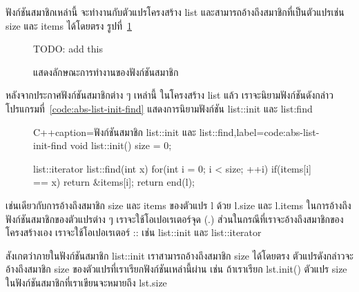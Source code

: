 ฟังก์ชัน{\wbr}สมาชิก{\wbr}เหล่านี้ จะ{\wbr}ทำงาน{\wbr}กับ{\wbr}ตัวแปร{\wbr}โครงสร้าง {\ct list}
และ{\wbr}สามารถ{\wbr}อ้าง{\wbr}ถึง{\wbr}สมาชิก{\wbr}ที่{\wbr}เป็น{\wbr}ตัวแปร{\wbr}เช่น {\ct size} และ {\ct items} ได้{\wbr}โดย{\wbr}ตรง{\wbr}
รูป{\wbr}ที่~\ref{fig:abs-member-functions}

\begin{figure}
TODO: add this
\caption{แสดง{\wbr}ลักษณะ{\wbr}การ{\wbr}ทำงาน{\wbr}ของ{\wbr}ฟังก์ชัน{\wbr}สมาชิก}
\label{fig:abs-member-functions}
\end{figure}

หลังจาก{\wbr}ประกาศ{\wbr}ฟังก์ชัน{\wbr}สมาชิก{\wbr}ต่าง ๆ เหล่านี้ ใน{\wbr}โครงสร้าง {\ct list} แล้ว{\wbr}
เรา{\wbr}จะ{\wbr}นิยาม{\wbr}ฟังก์ชัน{\wbr}ดังกล่าว โปรแกรม{\wbr}ที่~\ref{code:abs-list-init-find}
แสดง{\wbr}การ{\wbr}นิยาม{\wbr}ฟังก์ชัน {\ct list::init} และ {\ct list:find}

\begin{figure}
\latintext
\begin{codelist}{C++}{caption={\thaitext ฟังก์ชัน{\wbr}สมาชิก {\ct list::init} และ {\ct list::find}\latintext},label=code:abs-list-init-find}
void list::init()
{
  size = 0;
}

list::iterator list::find(int x)
{
  for(int i = 0; i < size; ++i)
    if(items[i] == x)
      return &items[i];
  return end(l);
}
\end{codelist}
\thaitext
\end{figure}

เช่นเดียวกับ{\wbr}การ{\wbr}อ้าง{\wbr}ถึง{\wbr}สมาชิก {\ct size} และ {\ct items} ของ{\wbr}ตัวแปร {\ct l} ด้วย{\wbr}
{\ct l.size} และ {\ct l.items} ใน{\wbr}การ{\wbr}อ้าง{\wbr}ถึง{\wbr}ฟังก์ชัน{\wbr}สมาชิก{\wbr}ของ{\wbr}ตัวแปร{\wbr}ต่าง ๆ
เรา{\wbr}จะ{\wbr}ใช้{\wbr}โอ{\wbr}เปอเรเตอร์{\wbr}จุด ({\ct .})  ส่วน{\wbr}ใน{\wbr}กรณี{\wbr}ที่{\wbr}เรา{\wbr}จะ{\wbr}อ้าง{\wbr}ถึง{\wbr}สมาชิก{\wbr}ของ{\wbr}โครงสร้าง{\wbr}เอง{\wbr}
เรา{\wbr}จะ{\wbr}ใช้{\wbr}โอ{\wbr}เปอเรเตอร์ {\ct ::} เช่น {\ct list::init} และ {\ct
  list::iterator}

สังเกต{\wbr}ว่า{\wbr}ภายใน{\wbr}ฟังก์ชัน{\wbr}สมาชิก {\ct list::init} เรา{\wbr}สามารถ{\wbr}อ้าง{\wbr}ถึง{\wbr}สมาชิก {\ct size}
ได้{\wbr}โดย{\wbr}ตรง ตัวแปร{\wbr}ดังกล่าว{\wbr}จะ{\wbr}อ้าง{\wbr}ถึง{\wbr}สมาชิก {\ct size}
ของ{\wbr}ตัวแปร{\wbr}ที่{\wbr}เรา{\wbr}เรียก{\wbr}ฟังก์ชัน{\wbr}เหล่านี้{\wbr}ผ่าน เช่น ถ้า{\wbr}เรา{\wbr}เรียก {\ct lst.init()} ตัวแปร{\wbr}
{\ct size} ใน{\wbr}ฟังก์ชัน{\wbr}สมาชิก{\wbr}ที่{\wbr}เรา{\wbr}เขียน{\wbr}จะ{\wbr}หมายถึง {\ct lst.size}

